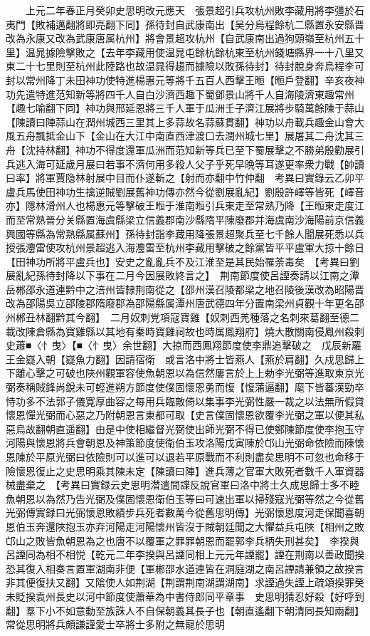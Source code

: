 　　上元二年春正月癸卯史思明改元應天　張景超引兵攻杭州敗李藏用將李彊於石夷門【敗補邁翻將即亮翻下同】孫待封自武康南出【吴分烏程餘杭二縣置永安縣晋改為永康又改為武康唐属杭州】將會景超攻杭州【自武康南出過狗頭嶺至杭州五十里】温晁據險擊敗之【去年李藏用使温晁屯餘杭餘杭東至杭州錢塘縣界一十八里又東二十七里則至杭州此陸路也故温晁得趨而據險以敗孫待封】待封脫身奔烏程李可封以常州降丁未田神功使特進楊惠元等將千五百人西擊王暅【暅戶登翻】辛亥夜神功先遣特進范知新等將四千人自白沙濟西趣下蜀鄧景山將千人自海陵濟東趣常州【趣七喻翻下同】神功與邢延恩將三千人軍于瓜洲壬子濟江展將步騎萬餘陳于蒜山【陳讀曰陣蒜山在潤州城西三里其上多蒜故名蒜蘇貫翻】神功以舟載兵趣金山會大風五舟飄抵金山下【金山在大江中南直西津渡口去潤州城七里】展屠其二舟沈其三舟【沈持林翻】神功不得度還軍瓜洲而范知新等兵已至下蜀展擊之不勝弟殷勸展引兵逃入海可延歲月展曰若事不濟何用多殺人父子乎死早晩等耳遂更率衆力戰【帥讀曰率】將軍賈隐林射展中目而仆遂斬之【射而亦翻中竹仲翻　考異曰實錄云乙卯平盧兵馬使田神功生擒逆賊劉展舊神功傳亦然今從劉展亂紀】劉殷許嶧等皆死【嶧音亦】隱林滑州人也楊惠元等擊破王暅于淮南暅引兵東走至常熟乃降【王暅東走度江而至常熟晉分关縣置海虞縣梁立信義郡南沙縣隋平陳廢郡并海虞南沙海陽前京信義興國等縣為常熟縣属蘇州】孫待封詣李藏用降張景超聚兵至七千餘人聞展死悉以兵授張灋雷使攻杭州景超逃入海灋雷至杭州李藏用擊破之餘黨皆平平盧軍大掠十餘日【田神功所將平盧兵也】安史之亂亂兵不及江淮至是其民始罹荼毒矣　【考異曰劉展亂紀孫待封降以下事在二月今因展敗終言之】　荆南節度使呂諲奏請以江南之潭岳郴邵永道連黔中之涪州皆隸荆南從之【邵州漢召陵都梁之地召陵後漢改為昭陽晋改為邵陽吳立邵陵郡隋廢郡為邵陽縣属潭州唐武德四年分置南梁州貞觀十年更名邵州郴丑林翻黔其今翻】　二月奴刺党項寇寶雞【奴刺西羌種落之名刺來葛翻至德二載改陳倉縣為寶雞縣以其地有秦時寶雞祠故也時属鳳翔府】燒大散關南侵鳳州殺刺史蕭■〈忄曳〉【■〈忄曳〉余世翻】大掠而西鳳翔節度使李鼎追擊破之　戊辰新羅王金嶷入朝【嶷魚力翻】因請宿衛　或言洛中將士皆燕人【燕於肩翻】久戍思歸上下離心擊之可破也陜州觀軍容使魚朝恩以為信然屢言於上上勅李光弼等進取東京光弼奏稱賊鋒尚銳未可輕進朔方節度使僕固懷恩勇而愎【愎蒲逼翻】麾下皆蕃漢勁卒恃功多不法郭子儀寛厚曲容之每用兵臨敵倚以集事李光弼性嚴一裁之以法無所假貸懷恩憚光弼而心惡之乃附朝恩言東都可取【史言僕固懷恩欲覆李光弼之軍以便其私惡烏故翻朝直遥翻】由是中使相繼督光弼使出師光弼不得已使鄭陳節度使李抱玉守河陽與懷恩將兵會朝恩及神策節度使衛伯玉攻洛陽戊寅陳於邙山光弼命依險而陳懷恩陳於平原光弼曰依險則可以進可以退若平原戰而不利則盡矣思明不可忽也命移于險懷恩復止之史思明乘其陳未定【陳讀曰陣】進兵薄之官軍大敗死者數千人軍資器械盡棄之　【考異曰實録云史思明潜遣間諜反說官軍曰洛中將士久成思歸士多不睦魚朝恩以為然乃告光弼及僕固懷恩衛伯玉等曰可速出軍以掃殘寇光弼等然之今從舊光弼傳實録曰光弼懷恩敗績步兵死者數萬今從舊思明傳】光弼懷恩度河走保聞喜朝恩伯玉奔還陜抱玉亦弃河陽走河陽懷州皆沒于賊朝廷聞之大懼益兵屯陜【相州之敗邙山之敗皆魚朝恩為之也唐不以覆軍之罪罪朝恩而罷郭李兵柄失刑甚矣】　李揆與呂諲同為相不相悦【乾元二年李揆與呂諲同相上元元年諲罷】諲在荆南以善政聞揆恐其復入相奏言置軍湖南非便【軍郴邵水道連皆在洞庭湖之南呂諲請兼領之故揆言非其便復扶又翻】又隂使人如荆湖【荆謂荆南湖謂湖南】求諲過失諲上疏頌揆罪癸未貶揆袁州長史以河中節度使蕭華為中書侍郎同平章事　史思明猜忍好殺【好呼到翻】羣下小不如意動至族誅人不自保朝義其長子也【朝直遙翻下朝清同長知兩翻】常從思明將兵頗謙謹愛士卒將士多附之無寵於思明